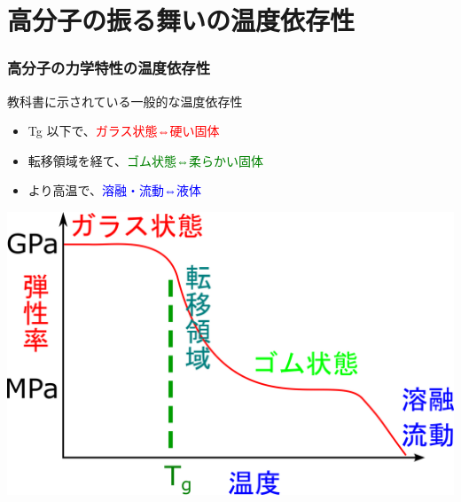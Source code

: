 \documentclass[unicode,12pt]{beamer}%
\begin{document}
\section{高分子の振る舞いの温度依存性}
\begin{frame}
	\frametitle{高分子の力学特性の温度依存性}
			\begin{block}{教科書に示されている一般的な温度依存性}
				\begin{itemize}
					\item Tg 以下で、\textcolor{red}{ガラス状態⇔硬い固体}
					\item 転移領域を経て、\textcolor{green}{ゴム状態⇔柔らかい固体}
					\item より高温で、\textcolor{blue}{溶融・流動⇔液体}
				\end{itemize}
			\end{block}
				\vspace{3mm}
				\begin{center}
					\includegraphics[width=.6\textwidth]{polymer_spectrum.png}
				\end{center}
\end{frame}
\end{document}
